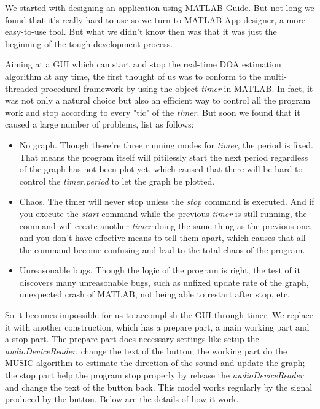 \documentclass[UTF8]{article}
\begin{document}
We started with designing an application using MATLAB Guide. But not
long we found that it's really hard to use so we turn to MATLAB App
designer, a more easy-to-use tool. But what we didn't know then was that
it was just the beginning of the tough development process.

Aiming at a GUI which can start and stop the real-time DOA estimation
algorithm at any time, the first thought of us was to conform to the
multi-threaded procedural framework by using the object \emph{timer}
in MATLAB. In fact, it was not only a natural choice but also an
efficient way to control all the program work and stop according to
every "tic" of the \emph{timer}. But soon we found that it caused a
large number of problems, list as follows:

\begin{itemize}
\item
  No graph. Though there're three running modes for \emph{timer}, the
  period is fixed. That means the program itself will pitilessly start
  the next period regardless of the graph has not been plot yet, which
  caused that there will be hard to control the \emph{timer.period} to
  let the graph be plotted.
\item
  Chaos. The timer will never stop unless the \emph{stop} command is
  executed. And if you execute the \emph{start} command while the
  previous \emph{timer} is still running, the command will create
  another \emph{timer} doing the same thing as the previous one, and
  you don't have effective means to tell them apart, which causes that
  all the command become confusing and lead to the total chaos of the
  program.
\item
  Unreasonable bugs. Though the logic of the program is right, the test
  of it discovers many unreasonable bugs, such as unfixed update rate of
  the graph, unexpected crash of MATLAB, not being able to restart after
  stop, etc.
\end{itemize}

So it becomes impossible for us to accomplish the GUI through timer. We
replace it with another construction, which has a prepare part, a main
working part and a stop part. The prepare part does necessary settings
like setup the \emph{audioDeviceReader}, change the text of the
button; the working part do the MUSIC algorithm to estimate the
direction of the sound and update the graph; the stop part help the
program stop properly by release the \emph{audioDeviceReader} and
change the text of the button back. This model works regularly by the
signal produced by the button. Below are the details of how it work.
\end{document}
